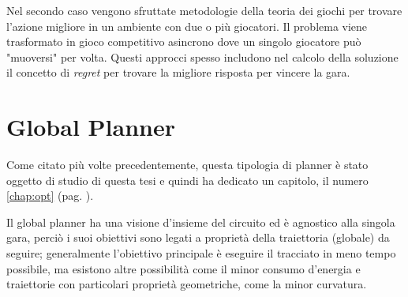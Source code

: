 Nel secondo caso vengono sfruttate metodologie della teoria dei giochi per trovare l'azione migliore in
un ambiente con due o più giocatori. Il problema viene trasformato in gioco competitivo asincrono dove un
singolo giocatore può "muoversi" per volta. Questi approcci spesso includono nel calcolo della soluzione il
concetto di \textit{regret} per trovare la migliore risposta per vincere la gara.

\section{Global Planner}
Come citato più volte precedentemente, questa tipologia di planner è stato oggetto di studio di questa
tesi e quindi ha dedicato un capitolo, il numero \ref{chap:opt} (pag. \pageref{chap:opt}).

Il global planner ha una visione d'insieme del circuito ed è agnostico alla singola gara, perciò i suoi
obiettivi sono legati a proprietà della traiettoria (globale) da seguire; generalmente l'obiettivo
principale è eseguire il tracciato in meno tempo possibile, ma esistono altre possibilità come il minor
consumo d'energia e traiettorie con particolari proprietà geometriche, come la minor curvatura.

